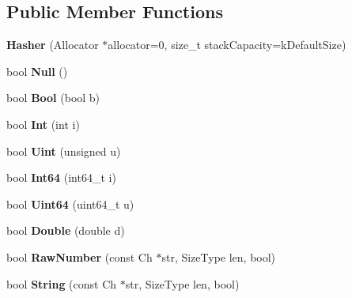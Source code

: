 \subsection*{Public Member Functions}
\begin{DoxyCompactItemize}
\item 
\mbox{\label{classinternal_1_1Hasher_a7b6abfdd3bdc60064a2322cdd20708c1}} 
{\bfseries Hasher} (Allocator $\ast$allocator=0, size\+\_\+t stack\+Capacity=k\+Default\+Size)
\item 
\mbox{\label{classinternal_1_1Hasher_a57c656866aa08cc7c448ce47b7a243c3}} 
bool {\bfseries Null} ()
\item 
\mbox{\label{classinternal_1_1Hasher_a11efd784a4e9c4f8a3dc281552df0486}} 
bool {\bfseries Bool} (bool b)
\item 
\mbox{\label{classinternal_1_1Hasher_aadbadf98ee7c9ab03a636e0f06d38bac}} 
bool {\bfseries Int} (int i)
\item 
\mbox{\label{classinternal_1_1Hasher_a4401600c24c817a45cea6c281438e5b4}} 
bool {\bfseries Uint} (unsigned u)
\item 
\mbox{\label{classinternal_1_1Hasher_ae0579cd54b3c545f77452543793b9a97}} 
bool {\bfseries Int64} (int64\+\_\+t i)
\item 
\mbox{\label{classinternal_1_1Hasher_a14832ac4ec204f1065b929df2c255457}} 
bool {\bfseries Uint64} (uint64\+\_\+t u)
\item 
\mbox{\label{classinternal_1_1Hasher_a83abe847e24ed88d5aab092d840e37c1}} 
bool {\bfseries Double} (double d)
\item 
\mbox{\label{classinternal_1_1Hasher_ae277289ad2fb3a938a6507e566d3c5e2}} 
bool {\bfseries Raw\+Number} (const Ch $\ast$str, Size\+Type len, bool)
\item 
\mbox{\label{classinternal_1_1Hasher_a885f2bf42f2bb64d6f9443129dce3883}} 
bool {\bfseries String} (const Ch $\ast$str, Size\+Type len, bool)

\end{DoxyCompactItemize}
